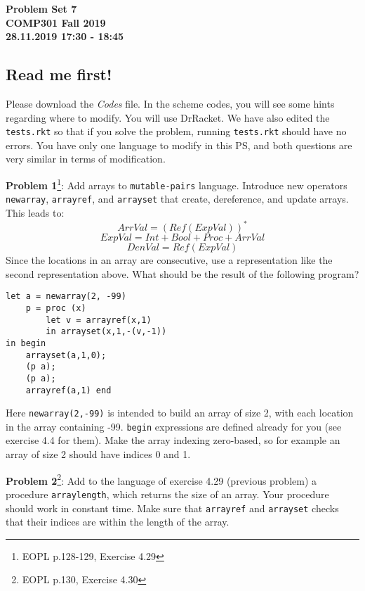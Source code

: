 \documentclass[12pt,reqno]{amsart}
\newcommand{\code}[1]{\texttt{#1}}
\begin{document}
\thispagestyle{empty}
\begin{center}
\large\textbf{Problem Set 7 \\ COMP301 Fall 2019} \\
\normalsize\textbf{28.11.2019 17:30 - 18:45} \\
\end{center}

\vspace{7.5mm}

\subsection*{Read me first!} Please download the \textit{Codes} file. In the scheme codes, you will see some hints regarding where to modify. You will use DrRacket. We have also edited the \code{tests.rkt} so that if you solve the problem, running \code{tests.rkt} should have no errors. You have only one language to modify in this PS, and both questions are very similar in terms of modification.

\vspace{7.5mm}

\textbf{Problem 1}\footnote{EOPL p.128-129, Exercise 4.29}: Add arrays to \code{mutable-pairs} language. Introduce new operators \code{newarray}, \code{arrayref}, and \code{arrayset} that create, dereference, and update arrays. This leads to:
$$
ArrVal = (Ref(ExpVal))^*
$$
$$
ExpVal = Int + Bool + Proc + ArrVal
$$
$$
DenVal = Ref(ExpVal)
$$
Since the locations in an array are consecutive, use a representation like the second representation above. What should be the result of the following program?
\begin{lstlisting}
let a = newarray(2, -99)
    p = proc (x)
        let v = arrayref(x,1)
        in arrayset(x,1,-(v,-1))
in begin 
    arrayset(a,1,0); 
    (p a); 
    (p a); 
    arrayref(a,1) end
\end{lstlisting}
Here \code{newarray(2,-99)} is intended to build an array of size 2, with each location in the array containing -99. \code{begin} expressions are defined already for you (see exercise 4.4 for them). Make the array indexing zero-based, so for example an array of size 2 should have indices 0 and 1.

\vspace{7.5mm}

\textbf{Problem 2}\footnote{EOPL p.130, Exercise 4.30}: Add to the language of exercise 4.29 (previous problem) a procedure \code{arraylength}, which returns the size of an array. Your procedure should work in constant time. Make sure that \code{arrayref} and \code{arrayset} checks that their indices are within the length of the array.
\end{document}
